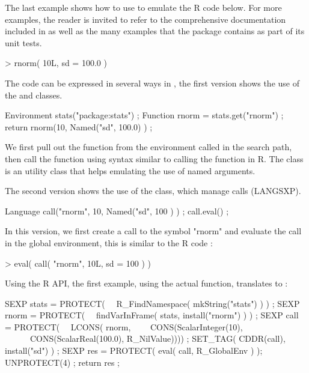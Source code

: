 The last example shows how to use  to emulate the R code below.
For more examples, the reader is invited to 
refer to the comprehensive documentation included in 
as well as the many examples that the package contains as part of 
its unit tests. 

\begin{example}
> rnorm( 10L, sd = 100.0 )
\end{example}

The code can be expressed in several ways in , the first version
shows the use of the  and  classes. 

\begin{example}
Environment stats("package:stats") ;
Function rnorm = stats.get("rnorm") ;
return rnorm(10, Named("sd", 100.0) ) ;
\end{example}

We first pull out the  function from the environment 
called  in the search path, then call the function
using syntax similar to calling the function in R. The  
class is an utility class that helps emulating the use of 
named arguments.

The second version shows the use of the  class, which 
manage calls (LANGSXP). 

\begin{example}
Language call("rnorm", 10, Named("sd", 100 ) ) ;
call.eval() ;
\end{example}

In this version, we first create a call to the symbol "rnorm" and
evaluate the call in the global environment, this is similar to the 
R code : 

\begin{example}
> eval( call( "rnorm", 10L, sd = 100 ) )
\end{example}

Using the R API, the first example, using the actual
 function,
translates to :

\begin{example}
SEXP stats = PROTECT( 
\ \ R_FindNamespace( mkString("stats") ) ) ;
SEXP rnorm = PROTECT( 
\ \ findVarInFrame( stats, install("rnorm") ) ) ;
SEXP call  = PROTECT( 
\ \ LCONS( rnorm, 
\ \ \ \ CONS(ScalarInteger(10), 
\ \ \ \ \ \ CONS(ScalarReal(100.0), R_NilValue)))) ;
SET_TAG( CDDR(call), install("sd") ) ;
SEXP res = PROTECT( eval( call, R_GlobalEnv ) );
UNPROTECT(4) ;
return res ;
\end{example}

